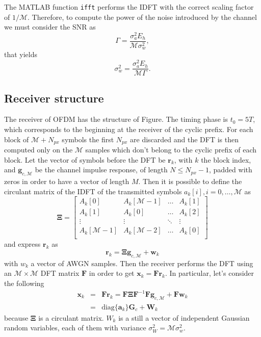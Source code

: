 \documentclass[10pt]{article}
\newcommand{\ofdM} {\mathcal{M}}
\newcommand{\DFTmat} {\mathcal{\mathbf{F}}}
\begin{document}
The MATLAB function \texttt{ifft} performs the IDFT with the correct scaling factor of $1/\ofdM$. Therefore, to compute the power of the noise introduced by the channel we must consider the SNR as
\begin{equation}
	\Gamma = \dfrac{\sigma_a^2 E_h}{\ofdM \sigma_w^2},
\end{equation}
that yields
\begin{equation}
	\sigma_w^2 = \dfrac{\sigma_a^2 E_h}{\ofdM \Gamma}.
\end{equation}


\subsection*{Receiver structure}
The receiver of OFDM has the structure of Figure. The timing phase is $t_0 = 5 T$, which corresponds to the beginning at the receiver of the cyclic prefix. For each block of $\ofdM + N_{px}$ symbols the first $N_{px}$ are discarded and the DFT is then computed only on the $\ofdM$ samples which don't belong to the cyclic prefix of each block. Let the vector of symbols before the DFT be $\mathbf{r}_k$, with $k$ the block index, and $\mathbf{g}_{c,\ofdM}$ be the channel impulse response, of length $N \le N_{px} - 1$, padded with zeros in order to have a vector of length $M$. Then it is possible to define the circulant matrix of the IDFT of the transmitted symbols $a_k[i], i = 0, \dots, \ofdM$ as
\begin{equation}
	\boldsymbol{\Xi} = 
	\begin{bmatrix}
		A_k[0] & A_k[\ofdM - 1] & \dots & A_k[1] \\
		A_k[1] & A_k[0] & \dots & A_k[2] \\
		\vdots & \vdots & \ddots & \vdots \\
		A_k[\ofdM - 1] & A_k[\ofdM - 2] & \dots & A_k[0] \\
	\end{bmatrix}
\end{equation}
and express $\mathbf{r}_k$ as
\begin{equation}
	\mathbf{r}_k = \boldsymbol{\Xi} \mathbf{g}_{c,\ofdM} + \mathbf{w}_k
\end{equation}
with $w_k$ a vector of AWGN samples. Then the receiver performs the DFT using an $\ofdM \times \ofdM$ DFT matrix $\DFTmat$ in order to get $ \mathbf{x}_k = \DFTmat \mathbf{r}_k$. In particular, let's consider the following 
\begin{eqnarray}
	 \mathbf{x}_k & = & \DFTmat \mathbf{r}_k = \DFTmat \boldsymbol{\Xi} \DFTmat^{-1} \DFTmat \mathbf{g}_{c,\ofdM} + \DFTmat \mathbf{w}_k\\
	  & = & \mathrm{diag}\{\mathbf{a}_k\} \mathbf{G}_c + \mathbf{W}_k
\end{eqnarray}
because $\boldsymbol{\Xi}$ is a circulant matrix. $W_k$ is a still a vector of independent Gaussian random variables, each of them with variance $\sigma_W^2 = \ofdM \sigma_w^2$. 
\end{document}
